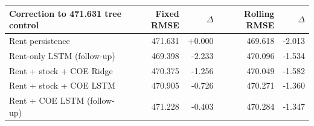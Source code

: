 \begin{tabular}{lrrrr}
\toprule
Correction to 471.631 tree control & Fixed RMSE & $\Delta$ & Rolling RMSE & $\Delta$ \\
\midrule
Rent persistence & 471.631 & +0.000 & 469.618 & -2.013 \\
Rent-only LSTM (follow-up) & 469.398 & -2.233 & 470.096 & -1.534 \\
Rent + stock + COE Ridge & 470.375 & -1.256 & 470.049 & -1.582 \\
Rent + stock + COE LSTM & 470.905 & -0.726 & 470.271 & -1.360 \\
Rent + COE LSTM (follow-up) & 471.228 & -0.403 & 470.284 & -1.347 \\
\bottomrule
\end{tabular}
